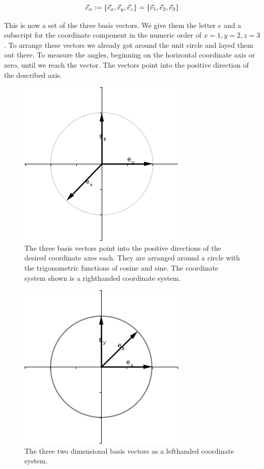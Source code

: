 \documentclass[a4paper]{article}
\begin{document}
\begin{Example}
\begin{displaymath}
\vec{e}_{n} := \{\vec{e}_x, \vec{e}_y, \vec{e}_z\} = \{\vec{e}_1, \vec{e}_2, \vec{e}_3\}\\
\end{displaymath} 

This is now a set of the three basis vectors. We give them the letter $e$ and a subscript for the coordinate component in the numeric order of $x=1, y=2, z=3$. To arrange these vectors we already got around the unit circle and layed them out there. To measure the angles, beginning on the horizontal coordinate axis or zero, until we reach the vector. The vectors point into the positive direction of the described axis.\\

\begin{figure}[ht]
\includegraphics[scale=0.8]{righthand45.png}
\caption{The three basis vectors point into the positive directions of the desired coordinate axes each. They are arranged around a circle with the trigonometric functions of cosine and sine. The coordinate system shown is a righthanded coordinate system.}
\end{figure}

\begin{figure}[ht]\includegraphics[scale=0.8]{lefthand45.png}
\caption{The three two dimensional basis vectors as a lefthanded coordinate system.}
\end{figure}


\end{Example}
\end{document}
